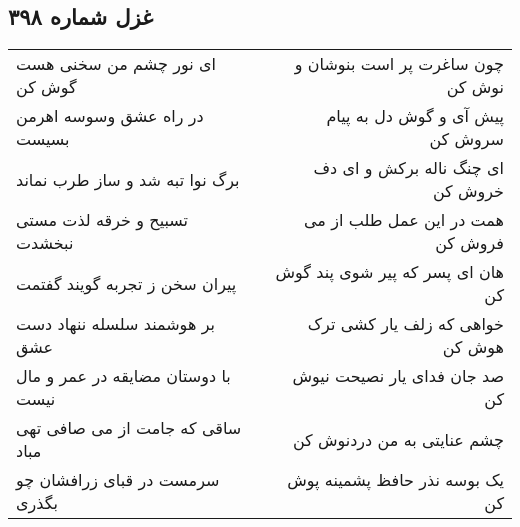 \begin{center}
\section*{غزل شماره ۳۹۸}
\label{sec:sh398}
\begin{longtable}{l p{0.5cm} r}
ای نور چشم من سخنی هست گوش کن
&&
چون ساغرت پر است بنوشان و نوش کن
\\
در راه عشق وسوسه اهرمن بسیست
&&
پیش آی و گوش دل به پیام سروش کن
\\
برگ نوا تبه شد و ساز طرب نماند
&&
ای چنگ ناله برکش و ای دف خروش کن
\\
تسبیح و خرقه لذت مستی نبخشدت
&&
همت در این عمل طلب از می فروش کن
\\
پیران سخن ز تجربه گویند گفتمت
&&
هان ای پسر که پیر شوی پند گوش کن
\\
بر هوشمند سلسله ننهاد دست عشق
&&
خواهی که زلف یار کشی ترک هوش کن
\\
با دوستان مضایقه در عمر و مال نیست
&&
صد جان فدای یار نصیحت نیوش کن
\\
ساقی که جامت از می صافی تهی مباد
&&
چشم عنایتی به من دردنوش کن
\\
سرمست در قبای زرافشان چو بگذری
&&
یک بوسه نذر حافظ پشمینه پوش کن
\\
\end{longtable}
\end{center}
